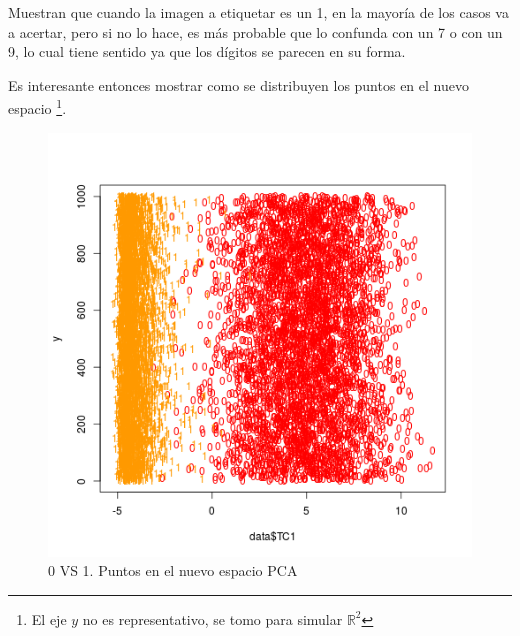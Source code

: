 Muestran que cuando la imagen a etiquetar es un 1, en la mayor\'ia de los casos va a acertar, pero si no lo hace, es m\'as probable que lo confunda con un 7 o con un 9, lo cual tiene sentido ya que los d\'igitos se parecen en su forma.

Es interesante entonces mostrar como se distribuyen los puntos en el nuevo espacio \footnote{El eje $y$ no es representativo, se tomo para simular $\mathbb{R}^{2}$}.

\begin{figure}[h!]
  \begin{center}
	\includegraphics[scale=0.8]{exp5/PCA-1-0vs1}
	\caption{0 VS 1. Puntos en el nuevo espacio PCA}
  \end{center}
\end{figure}

\newpage

